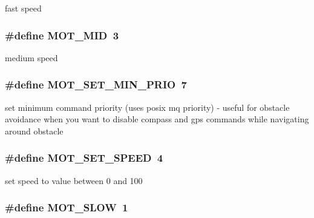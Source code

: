 fast speed \hypertarget{group__motor__commands_ga90a66dc37a63d7ff939b606b1d5ba87c}{
\subsubsection[{M\-O\-T\-\_\-\-M\-I\-D}]{\setlength{\rightskip}{0pt plus 5cm}\#define M\-O\-T\-\_\-\-M\-I\-D~3}}\label{group__motor__commands_ga90a66dc37a63d7ff939b606b1d5ba87c}
medium speed \hypertarget{group__motor__commands_ga0c48e1fea8fe34438ee9e9b2e101d1de}{
\subsubsection[{M\-O\-T\-\_\-\-S\-E\-T\-\_\-\-M\-I\-N\-\_\-\-P\-R\-I\-O}]{\setlength{\rightskip}{0pt plus 5cm}\#define M\-O\-T\-\_\-\-S\-E\-T\-\_\-\-M\-I\-N\-\_\-\-P\-R\-I\-O~7}}\label{group__motor__commands_ga0c48e1fea8fe34438ee9e9b2e101d1de}
set minimum command priority (uses posix mq priority) -\/ useful for obstacle avoidance when you want to disable compass and gps commands while navigating around obstacle \hypertarget{group__motor__commands_ga318320d9d310be3e25a20f55ccbda7a6}{
\subsubsection[{M\-O\-T\-\_\-\-S\-E\-T\-\_\-\-S\-P\-E\-E\-D}]{\setlength{\rightskip}{0pt plus 5cm}\#define M\-O\-T\-\_\-\-S\-E\-T\-\_\-\-S\-P\-E\-E\-D~4}}\label{group__motor__commands_ga318320d9d310be3e25a20f55ccbda7a6}
set speed to value between 0 and 100 \hypertarget{group__motor__commands_gab1d9e4b8515c9040e93ba9edcdb843a3}{
\subsubsection[{M\-O\-T\-\_\-\-S\-L\-O\-W}]{\setlength{\rightskip}{0pt plus 5cm}\#define M\-O\-T\-\_\-\-S\-L\-O\-W~1}}\label{group__motor__commands_gab1d9e4b8515c9040e93ba9edcdb843a3}
